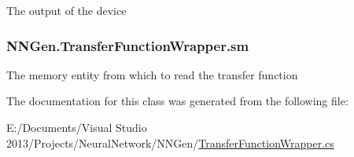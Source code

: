 The output of the device 

\hypertarget{class_n_n_gen_1_1_transfer_function_wrapper_aecb111b0e3e39a4dec337da6288341f4}{}
\subsubsection[{sm}]{ N\+N\+Gen.\+Transfer\+Function\+Wrapper.\+sm\hspace{0.3cm}{\ttfamily [get]}}\label{class_n_n_gen_1_1_transfer_function_wrapper_aecb111b0e3e39a4dec337da6288341f4}


The memory entity from which to read the transfer function 



The documentation for this class was generated from the following file\+:\begin{DoxyCompactItemize}
\item 
E\+:/\+Documents/\+Visual Studio 2013/\+Projects/\+Neural\+Network/\+N\+N\+Gen/\hyperlink{_transfer_function_wrapper_8cs}{Transfer\+Function\+Wrapper.\+cs}\end{DoxyCompactItemize}
